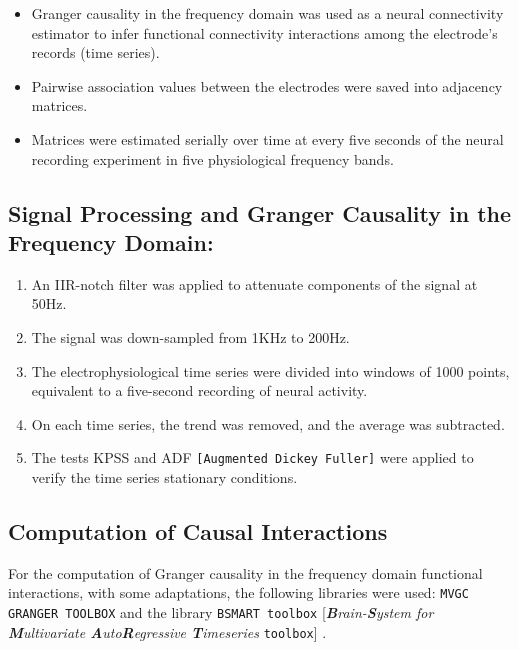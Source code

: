 \documentclass[twoside]{article}
\begin{document}
\begin{multicols}{2}
\begin{itemize}
\item Granger causality in the frequency domain was used as a neural connectivity estimator to infer functional connectivity interactions among the electrode's records (time series).

\item Pairwise association values between the electrodes were saved into adjacency matrices.

\item Matrices were estimated serially over time at every five seconds of the neural recording experiment in five physiological frequency bands.

\end{itemize}


\subsection{Signal Processing and Granger Causality in the Frequency Domain:}


\begin{enumerate}

\item An IIR-notch filter was applied to attenuate components of the signal at 50Hz.

\item The signal was down-sampled from 1KHz to 200Hz.

\item The electrophysiological time series were divided into windows of 1000 points, equivalent to a five-second recording of neural activity.

\item On each time series, the trend was removed, and the average was subtracted.

\item The tests KPSS \citep{kwiatkowski1992testing} and ADF \texttt{[Augmented Dickey Fuller]} \citep{hamilton1989new} were applied to verify the time series stationary conditions.


\end{enumerate}

\subsection{Computation of Causal Interactions}


For the computation of Granger causality in the frequency domain functional interactions, with some adaptations, the following libraries were used: \texttt{MVGC GRANGER TOOLBOX} \citep{seth2010matlab} and the library \texttt{BSMART toolbox} [\textit{\textbf{B}rain-\textbf{S}ystem for \textbf{M}ultivariate \textbf{A}uto\textbf{R}egressive \textbf{T}imeseries} \texttt{toolbox}] \citep{cui2008bsmart}.



\end{multicols}
\end{document}
